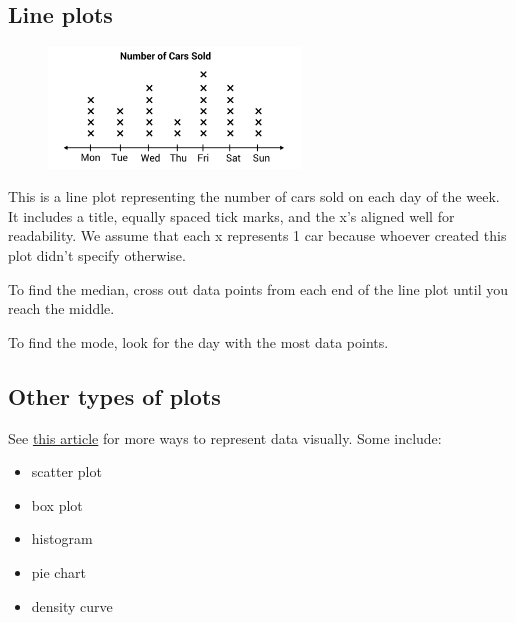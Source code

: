 \documentclass[a4paper, 12pt]{article}
\begin{document}
\subsection*{Line plots}

\begin{figure}[H]
\centering
\includegraphics[width=0.6\textwidth]{lineplot}
\end{figure}

This is a line plot representing the number of cars sold on each day of the week. It includes a title, equally spaced tick marks, and the x's aligned well for readability. We assume that each x represents 1 car because whoever created this plot didn't specify otherwise.

To find the median, cross out data points from each end of the line plot until you reach the middle. 

To find the mode, look for the day with the most data points.

\subsection*{Other types of plots}

See \href{https://www.atlassian.com/data/charts/essential-chart-types-for-data-visualization}{this article} for more ways to represent data visually. Some include:

\begin{itemize}
\item scatter plot
\item box plot
\item histogram
\item pie chart
\item density curve
\end{itemize}
\end{document}

